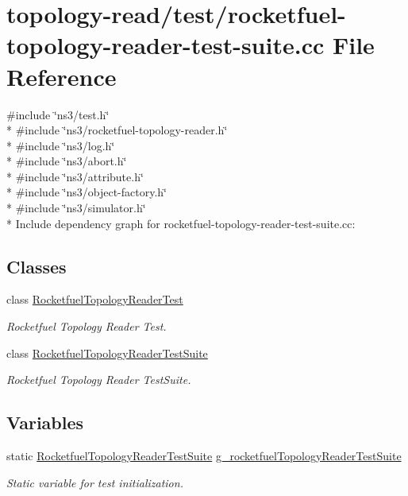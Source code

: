 \hypertarget{rocketfuel-topology-reader-test-suite_8cc}{}\section{topology-\/read/test/rocketfuel-\/topology-\/reader-\/test-\/suite.cc File Reference}
\label{rocketfuel-topology-reader-test-suite_8cc}
{\ttfamily \#include \char`\"{}ns3/test.\+h\char`\"{}}\\*
{\ttfamily \#include \char`\"{}ns3/rocketfuel-\/topology-\/reader.\+h\char`\"{}}\\*
{\ttfamily \#include \char`\"{}ns3/log.\+h\char`\"{}}\\*
{\ttfamily \#include \char`\"{}ns3/abort.\+h\char`\"{}}\\*
{\ttfamily \#include \char`\"{}ns3/attribute.\+h\char`\"{}}\\*
{\ttfamily \#include \char`\"{}ns3/object-\/factory.\+h\char`\"{}}\\*
{\ttfamily \#include \char`\"{}ns3/simulator.\+h\char`\"{}}\\*
Include dependency graph for rocketfuel-\/topology-\/reader-\/test-\/suite.cc\+:
\subsection*{Classes}
\begin{DoxyCompactItemize}
\item 
class \hyperlink{classRocketfuelTopologyReaderTest}{Rocketfuel\+Topology\+Reader\+Test}
\begin{DoxyCompactList}\small\item\em Rocketfuel Topology Reader Test. \end{DoxyCompactList}\item 
class \hyperlink{classRocketfuelTopologyReaderTestSuite}{Rocketfuel\+Topology\+Reader\+Test\+Suite}
\begin{DoxyCompactList}\small\item\em Rocketfuel Topology Reader Test\+Suite. \end{DoxyCompactList}\end{DoxyCompactItemize}
\subsection*{Variables}
\begin{DoxyCompactItemize}
\item 
static \hyperlink{classRocketfuelTopologyReaderTestSuite}{Rocketfuel\+Topology\+Reader\+Test\+Suite} \hyperlink{rocketfuel-topology-reader-test-suite_8cc_ac7646688c55dde5593a44980b107d95c}{g\+\_\+rocketfuel\+Topology\+Reader\+Test\+Suite}
\begin{DoxyCompactList}\small\item\em Static variable for test initialization. \end{DoxyCompactList}\end{DoxyCompactItemize}


